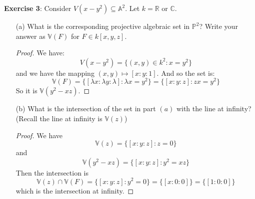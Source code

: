 \documentclass{article}
\begin{document}
\textbf{Exercise 3}: Consider $V(x - y^{2}) \subseteq \mathbb{A}^{2}$. Let $k = \mathbb{R}$ or $\mathbb{C}$.
    \begin{itemize}
        \item [(a)] What is the corresponding projective algebraic set in $\mathbb{P}^{2}$? Write your answer as $\mathbb{V}(F)$ for $F \in k[x, y, z]$.
            \begin{proof}
                We have:
                    \begin{equation*}
                        V(x - y^{2}) = \{(x, y) \in k^{2}: x = y^{2}\}
                    \end{equation*}
                and we have the mapping $(x, y) \mapsto [x : y : 1]$. And so the set is:
                    \begin{equation*}
                        \mathbb{V}(F) = \{[\lambda x : \lambda y : \lambda] : \lambda x = y^{2}\} = \{[x : y : z] : zx = y^{2}\}
                    \end{equation*}
                So it is $\mathbb{V}(y^{2} - xz)$.
            \end{proof}

        \item [(b)]What is the intersection of the set in part $(a)$ with the line at infinity? (Recall the line at infinity is $\mathbb{V}(z)$)
            \begin{proof}
                We have
                    \begin{equation*}
                        \mathbb{V}(z) = \{[x : y : z] : z = 0\}
                    \end{equation*}
                and
                    \begin{equation*}
                        \mathbb{V}(y^{2} - xz) = \{[x : y : z] : y^{2} = xz\}
                    \end{equation*}
                Then the intersection is
                    \begin{equation*}
                        \mathbb{V}(z) \cap \mathbb{V}(F) = \{[x : y : z] : y^{2} = 0\} = \{[x : 0 : 0]\} = \{[1 : 0 : 0]\}
                    \end{equation*}
                which is the intersection at infinity.
            \end{proof}


\end{itemize}
\end{document}
